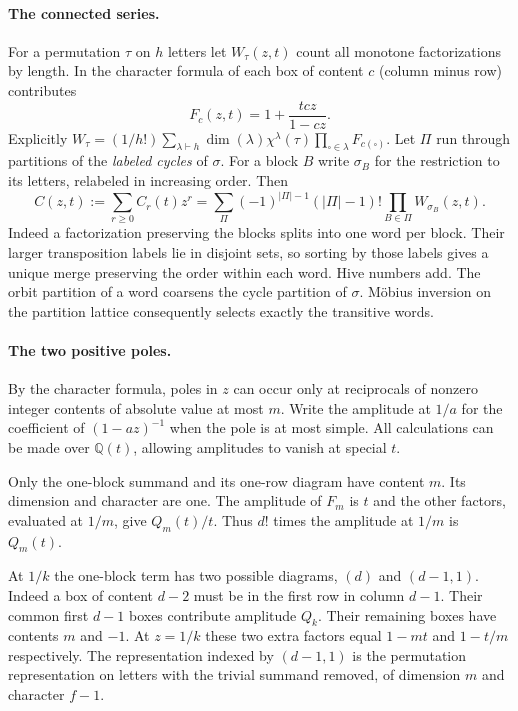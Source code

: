 \documentclass[11pt]{article}
\begin{document}
\paragraph{The connected series.}
For a permutation $\tau$ on $h$ letters let $W_\tau(z,t)$ count all monotone factorizations by length. In the character formula of \cite[Prop.~3.3]{cdm} each box of content $c$ (column minus row) contributes
\[
 F_c(z,t)=1+\frac{tcz}{1-cz}.
\]
Explicitly $W_\tau=(1/h!)\sum_{\lambda\vdash h}\dim(\lambda)\chi^\lambda(\tau)\prod_{\square\in\lambda} F_{c(\square)}$.
Let $\Pi$ run through partitions of the \emph{labeled cycles} of $\sigma$. For a block $B$ write $\sigma_B$ for the restriction to its letters, relabeled in increasing order. Then
\begin{equation}\label{eq:mobius}
 C(z,t):=\sum_{r\ge0} C_r(t)z^r
 =\sum_{\Pi}(-1)^{|\Pi|-1}(|\Pi|-1)!\prod_{B\in\Pi}W_{\sigma_B}(z,t).
\end{equation}
Indeed a factorization preserving the blocks splits into one word per block. Their larger transposition labels lie in disjoint sets, so sorting by those labels gives a unique merge preserving the order within each word. Hive numbers add. The orbit partition of a word coarsens the cycle partition of $\sigma$. M\"obius inversion on the partition lattice consequently selects exactly the transitive words.

\paragraph{The two positive poles.}
By the character formula, poles in $z$ can occur only at reciprocals of nonzero integer contents of absolute value at most $m$. Write the amplitude at $1/a$ for the coefficient of $(1-az)^{-1}$ when the pole is at most simple. All calculations can be made over $\mathbb Q(t)$, allowing amplitudes to vanish at special $t$.

Only the one-block summand and its one-row diagram have content $m$. Its dimension and character are one. The amplitude of $F_m$ is $t$ and the other factors, evaluated at $1/m$, give $Q_m(t)/t$. Thus $d!$ times the amplitude at $1/m$ is $Q_m(t)$.

At $1/k$ the one-block term has two possible diagrams, $(d)$ and $(d-1,1)$. Indeed a box of content $d-2$ must be in the first row in column $d-1$. Their common first $d-1$ boxes contribute amplitude $Q_k$. Their remaining boxes have contents $m$ and $-1$. At $z=1/k$ these two extra factors equal $1-mt$ and $1-t/m$ respectively. The representation indexed by $(d-1,1)$ is the permutation representation on letters with the trivial summand removed, of dimension $m$ and character $f-1$.
\end{document}
